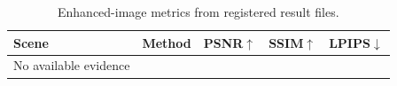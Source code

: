 \begin{table}[t]
\centering
\caption{Enhanced-image metrics from registered result files.}
\label{tab:supp_metrics}
\begin{tabular}{lllll}
\toprule
Scene & Method & PSNR$\uparrow$ & SSIM$\uparrow$ & LPIPS$\downarrow$ \\
\midrule
\multicolumn{1}{c}{No available evidence} \\
\bottomrule
\end{tabular}
\end{table}
